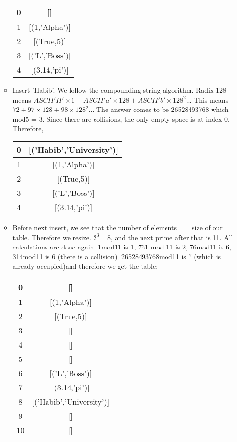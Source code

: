 \documentclass{article}
\begin{document}
\begin{enumerate}
\begin{itemize}
				\begin{center}
					\begin{tabular}{ |c|c| } 
						\hline
						0 & []   \\ 
						\hline
						1 &	[(1,'Alpha')] \\
						\hline 
						2 & [(True,5)]  \\ 
						\hline
						3&[('L','Boss')]\\
						\hline
						4&[(3.14,'pi')]\\
						\hline
					\end{tabular}
				\end{center}
				\item Insert 'Habib'. We follow the compounding string algorithm. Radix 128 means $ASCII 'H' \times 1 + ASCII 'a' \times 128 + ASCII 'b' \times128^2 ...$ This means $72 + 97\times 128 + 98 \times 128^2$... The answer comes to be 26528493768 which mod5 = 3. Since there are collisions, the only empty space is at index 0. Therefore,
				\begin{center}
					\begin{tabular}{ |c|c| } 
						\hline
						0 & [('Habib','University')]   \\ 
						\hline
						1 &	[(1,'Alpha')] \\
						\hline 
						2 & [(True,5)]  \\ 
						\hline
						3&[('L','Boss')]\\
						\hline
						4&[(3.14,'pi')]\\
						\hline
					\end{tabular}
				\end{center}
		\item Before next insert, we see that the number of elements == size of our table. Therefore we resize. $2^3$ =8, and the next prime after that is 11. All calculations are done again. 1mod11 is 1, 761 mod 11 is 2, 76mod11 is 6, 314mod11 is 6 (there is a collision), 26528493768mod11 is 7 (which is already occupied)and therefore we get the table;
				\begin{center}
					\begin{tabular}{ |c|c| } 
						\hline
						0 & []   \\ 
						\hline
						1 &	[(1,'Alpha')] \\
						\hline 
						2 & [(True,5)]  \\ 
						\hline
						3&[]\\
						\hline
						4&[]\\
						\hline
						5&[]\\
						\hline
						6&[('L','Boss')]\\
						\hline
						7&[(3.14,'pi')]\\
						\hline
						8&[('Habib','University')]\\
						\hline
						9&[]\\
						\hline
						10&[]\\
						\hline
					\end{tabular}
				\end{center}
				

\end{itemize}
\end{enumerate}
\end{document}
